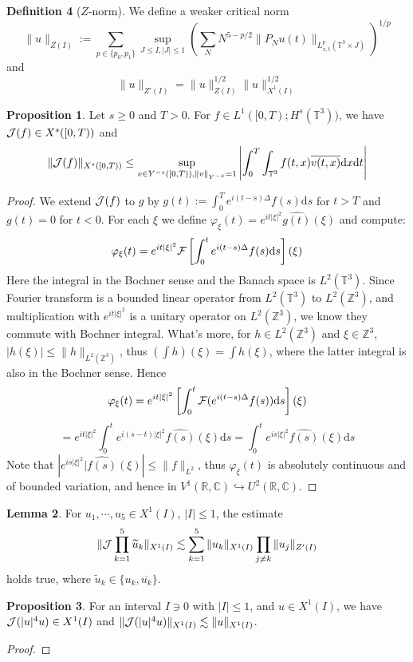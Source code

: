 \documentclass{article}
\theoremstyle{definition}
\newtheorem{definition}{Definition}[subsection]
\newtheorem{proposition}[definition]{Proposition}
\newtheorem{lemma}[definition]{Lemma}
\theoremstyle{remark}
\newcommand{\dif}{\mathrm{d}}
\begin{document}
\begin{definition}[$Z$-norm]We define a weaker critical norm
$$\|u\|_{Z(I)}:=\sum_{p\in\{p_0,p_1\}}\sup_{J\le I,|J|\le1}\left(\sum_NN^{5-p/2}\|P_Nu(t)\|_{L^p_{x,t}(\mathbb{T}^3\times J)}\right)^{1/p}$$
and 
$$\|u\|_{Z'(I)}=\|u\|_{Z(I)}^{1/2}\|u\|_{X^1(I)}^{1/2}$$

\begin{proposition}
Let $s\ge0$ and $T>0$. For $f\in L^1([0,T);H^s(\mathbb{T}^3))$, we have ${\cal J}(f)\in X^s([0,T))$ and 
$$\|{\cal J}(f)\|_{X^s([0,T))}\le\sup_{v\in Y^{-s}([0,T)),\|v\|_{Y^{-s}}=1}\left|\int_
0^T\int_{\mathbb{T}^3}f(t,x)\overline{v(t,x)}\dif x\dif t\right|$$
\end{proposition}
\begin{proof}
We extend ${\cal J}(f)$ to $g$ by $g(t):=\int_0^Te^{i(t-s)\Delta}f(s)\dif s$ for $t>T$ and $g(t)=0$ for $t<0$. For each $\xi$ we define $\varphi_\xi(t)=e^{it|\xi|^2}\widehat{g(t)}(\xi)$ and compute: 
$$\varphi_\xi(t)=e^{it|\xi|^2}{\cal F}\left[\int_0^te^{i(t-s)\Delta}f(s)\dif s\right](\xi)$$
Here the integral in the Bochner sense and the Banach space is $L^2(\mathbb{T}^3)$. Since Fourier transform is a bounded linear operator from $L^2(\mathbb{T}^3)$ to $L^2(\mathbb{Z}^3)$, and multiplication with $e^{it|\xi|^2}$ is a unitary operator on $L^2(\mathbb{Z}^3)$, we know they commute with Bochner integral. What's more, for $h\in L^2(\mathbb{Z}^3)$ and $\xi\in\mathbb{Z}^3$, $|h(\xi)|\le\|h\|_{L^2(\mathbb{Z}^3)}$, thus $(\int h)(\xi)=\int h(\xi)$, where the latter integral is also in the Bochner sense. Hence
$$\varphi_\xi(t)=e^{it|\xi|^2}\left[\int_0^t{\cal F}(e^{i(t-s)\Delta}f(s))\dif s\right](\xi)$$
$$=e^{it|\xi|^2}\int_0^te^{i(s-t)|\xi|^2}\widehat{f(s)}(\xi)\dif s=\int_0^te^{is|\xi|^2}\widehat{f(s)}(\xi)\dif s$$
Note that $\left|e^{is|\xi|^2}|\widehat{f(s)}(\xi)\right|\le\|f\|_{L^2}$, thus $\varphi_\xi(t)$ is absolutely continuous and of bounded variation, and hence in $V^1(\mathbb{R},\mathbb{C})\hookrightarrow U^2(\mathbb{R},\mathbb{C})$. 
\end{proof}

\begin{lemma}
For $u_1,\cdots,u_5\in X^1(I)$, $|I|\le1$, the estimate
$$\|{\cal J}\prod_{k=1}^5\widetilde{u}_k\|_{X^1(I)}\lesssim\sum_{k=1}^5\|u_k\|_{X^1(I)}\prod_{j\ne k}\|u_j\|_{Z'(I)}$$
holds true, where $\widetilde{u}_k\in\{u_k,\overline{u_k}\}$. 
\end{lemma}

\begin{proposition}
For an interval $I\ni0$ with $|I|\le1$, and $u\in X^1(I)$, we have ${\cal J}(|u|^4u)\in X^1(I)$ and $\|{\cal J}(|u|^4u)\|_{X^1(I)}\lesssim\|u\|_{X^1(I)}$. 
\end{proposition}
\begin{proof}

\end{proof}

\end{definition}
\end{document}
